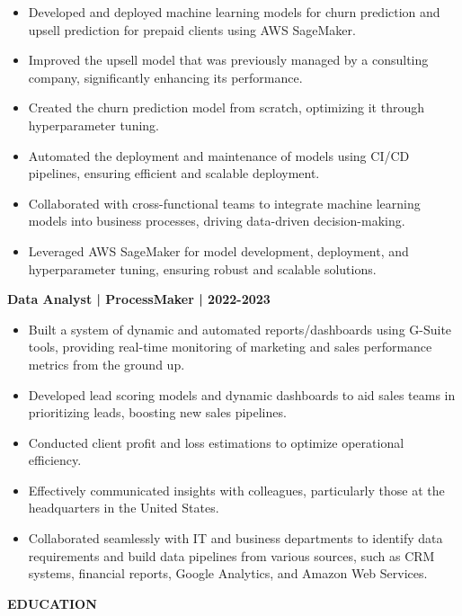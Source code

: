 \documentclass[10pt, letterpaper]{article}
\begin{document}
\begin{itemize}[noitemsep]
\item Developed and deployed machine learning models for churn prediction and upsell prediction for prepaid clients using AWS SageMaker.
\item Improved the upsell model that was previously managed by a consulting company, significantly enhancing its performance.
\item Created the churn prediction model from scratch, optimizing it through hyperparameter tuning.
\item Automated the deployment and maintenance of models using CI/CD pipelines, ensuring efficient and scalable deployment.
\item Collaborated with cross-functional teams to integrate machine learning models into business processes, driving data-driven decision-making.
\item Leveraged AWS SageMaker for model development, deployment, and hyperparameter tuning, ensuring robust and scalable solutions.
\end{itemize}

\vspace{0.2cm}

\textbf{Data Analyst | ProcessMaker  | 2022-2023}

\begin{itemize}[noitemsep]
\item Built a system of dynamic and automated reports/dashboards using G-Suite tools, providing real-time monitoring of marketing and sales performance metrics from the ground up.
\item Developed lead scoring models and dynamic dashboards to aid sales teams in prioritizing leads, boosting new sales pipelines.
\item Conducted client profit and loss estimations to optimize operational efficiency.
\item Effectively communicated insights with colleagues, particularly those at the headquarters in the United States.
\item Collaborated seamlessly with IT and business departments to identify data requirements and build data pipelines from various sources, such as CRM systems, financial reports, Google Analytics, and Amazon Web Services.
\end{itemize}

\vspace{0.2cm}

\begin{flushleft}
\textbf{EDUCATION}
\end{flushleft}
\end{document}
